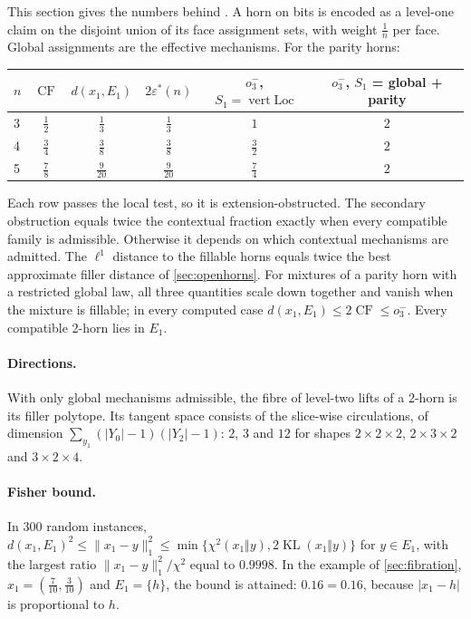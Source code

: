 \documentclass[11pt]{article}
\theoremstyle{definition}
\theoremstyle{remark}
\begin{document}
This section gives the numbers behind \cite[\S11]{Conditionals}. A horn on bits is encoded as a level-one claim on the
disjoint union of its face assignment sets, with weight $\frac1n$ per face. Global assignments are the effective
mechanisms. For the parity horns:
\begin{center}\small
\begin{tabular}{@{}lccccc@{}}
\toprule
$n$ & $\operatorname{CF}$ & $d(x_1,E_1)$ & $2\varepsilon^*(n)$ & $o_3^-$, $S_1=\operatorname{vert}\mathrm{Loc}$ & $o_3^-$, $S_1$ = global + parity\\
\midrule
3 & $\tfrac12$ & $\tfrac13$ & $\tfrac13$ & $1$ & $2$\\
4 & $\tfrac34$ & $\tfrac38$ & $\tfrac38$ & $\tfrac32$ & $2$\\
5 & $\tfrac78$ & $\tfrac9{20}$ & $\tfrac9{20}$ & $\tfrac74$ & $2$\\
\bottomrule
\end{tabular}
\end{center}
Each row passes the local test, so it is extension-obstructed. The secondary obstruction equals twice the contextual
fraction exactly when every compatible family is admissible. Otherwise it depends on which contextual mechanisms are
admitted. The $\ell^1$ distance to the fillable horns equals twice the best approximate filler distance of
\cref{sec:openhorns}. For mixtures of a parity horn with a restricted global law, all three quantities scale down together
and vanish when the mixture is fillable; in every computed case $d(x_1,E_1)\le2\operatorname{CF}\le o_3^-$. Every compatible
2-horn lies in $E_1$.

\paragraph{Directions.} With only global mechanisms admissible, the fibre of level-two lifts of a 2-horn is its filler
polytope. Its tangent space consists of the slice-wise circulations, of dimension $\sum_{y_1}(\lvert Y_0\rvert-1)(\lvert Y_2\rvert-1)$:
$2$, $3$ and $12$ for shapes $2\times2\times2$, $2\times3\times2$ and $3\times2\times4$.

\paragraph{Fisher bound.} In 300 random instances,
$d(x_1,E_1)^2\le\lVert x_1-y\rVert_1^2\le\min\{\chi^2(x_1\Vert y),2\operatorname{KL}(x_1\Vert y)\}$ for $y\in E_1$, with the largest
ratio $\lVert x_1-y\rVert_1^2/\chi^2$ equal to $0.9998$. In the example of \cref{sec:fibration}, $x_1=(\frac7{10},\frac3{10})$ and
$E_1=\{h\}$, the bound is attained: $0.16=0.16$, because $\lvert x_1-h\rvert$ is proportional to $h$.
\end{document}

